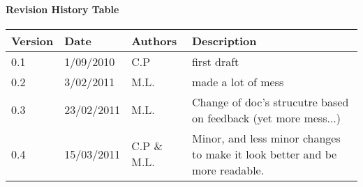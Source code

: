 \paragraph*{Revision History Table}

\begin{center}
\begin{tabular}{|p{1.5 cm}|p{2 cm}|p{1.5 cm}|p{6 cm}|} \hline

\textbf{Version} & \textbf{Date} & \textbf{Authors} & \textbf{Description} \\
\hline
0.1 & 1/09/2010 & C.P & first draft \\ \hline
0.2 & 3/02/2011 & M.L. & made a lot of mess \\ \hline
0.3 & 23/02/2011 & M.L. & Change of doc's strucutre based on feedback (yet more
mess...)\\ \hline
0.4 & 15/03/2011 & C.P \& M.L. & Minor, and less minor changes to make it look
 better and be more readable. \\ \hline
\end{tabular}
\end{center}


